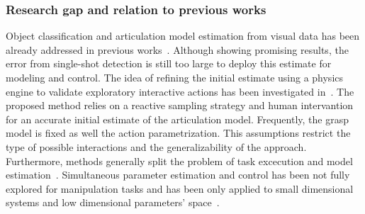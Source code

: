\subsubsection{Research gap and relation to previous works}
Object classification and articulation model estimation from visual data has been already addressed in previous works~\cite{he2017mask, li2020category}. Although showing promising results, the error from single-shot detection is still too large to deploy this estimate for modeling and control. The idea of refining the initial estimate using a physics engine to validate exploratory interactive actions has been investigated in~\cite{eppner2018physics}. The proposed method relies on a reactive sampling strategy and human intervantion for an accurate initial estimate of the articulation model. Frequently, the grasp model is fixed as well the action parametrization. This assumptions restrict the type of possible interactions and the generalizability of the approach. Furthermore, methods generally split the problem of task excecution and model estimation~\cite{eppner2018physics}. Simultaneous parameter estimation and control has been not fully explored for manipulation tasks and has been only applied to small dimensional systems and low dimensional parameters' space~\cite{barcelos2021dual}. 